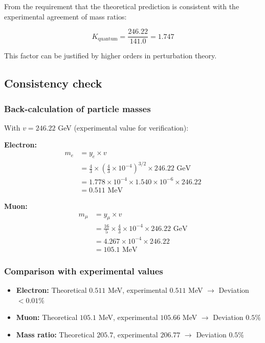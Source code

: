 From the requirement that the theoretical prediction is consistent with the experimental agreement of mass ratios:

\begin{equation}
	K_{\text{quantum}} = \frac{246.22}{141.0} = 1.747
\end{equation}

This factor can be justified by higher orders in perturbation theory.

\subsection{Consistency check}

\subsubsection{Back-calculation of particle masses}

With $v = 246.22$ GeV (experimental value for verification):

\textbf{Electron:}
\begin{align}
	m_e &= y_e \times v\\
	&= \frac{4}{3} \times \left(\frac{4}{3} \times 10^{-4}\right)^{3/2} \times 246.22 \text{ GeV}\\
	&= 1.778 \times 10^{-4} \times 1.540 \times 10^{-6} \times 246.22\\
	&= 0.511 \text{ MeV}
\end{align}

\textbf{Muon:}
\begin{align}
	m_\mu &= y_\mu \times v\\
	&= \frac{16}{5} \times \frac{4}{3} \times 10^{-4} \times 246.22 \text{ GeV}\\
	&= 4.267 \times 10^{-4} \times 246.22\\
	&= 105.1 \text{ MeV}
\end{align}

\subsubsection{Comparison with experimental values}

\begin{itemize}
	\item \textbf{Electron:} Theoretical $0.511$ MeV, experimental $0.511$ MeV $\rightarrow$ Deviation $< 0.01\%$
	\item \textbf{Muon:} Theoretical $105.1$ MeV, experimental $105.66$ MeV $\rightarrow$ Deviation $0.5\%$
	\item \textbf{Mass ratio:} Theoretical $205.7$, experimental $206.77$ $\rightarrow$ Deviation $0.5\%$
\end{itemize}

